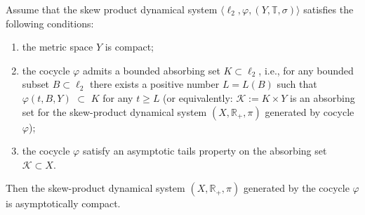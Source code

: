 \documentclass[10pt,a4paper]{amsart}
\begin{document}
\begin{lemma}\label{lCD1} Assume that the skew product dynamical
system $\langle \ell_{2},\varphi,(Y,\mathbb T,\sigma)\rangle$
satisfies the following conditions:
\begin{enumerate}
\item the metric space $Y$ is compact; \item the cocycle $\varphi$
admits a bounded absorbing set $K\subset \ell_{2}$, i.e., for any
bounded subset $B\subset \ell_{2}$ there exists a positive number
$L=L(B)$ such that $\varphi(t,B,Y)$ $\subset $ $K$ for any $t\ge
L$ (or equivalently: $\mathcal K:=K\times Y$ is an absorbing set
for the skew-product dynamical system $(X,\mathbb R_{+},\pi)$
generated by cocycle $\varphi$); \item the cocycle $\varphi$
satisfy an asymptotic tails property on the absorbing set
$\mathcal K \subset X$.
\end{enumerate}

Then the skew-product dynamical system $(X,\mathbb R_{+},\pi)$
generated by the cocycle $\varphi$ is asymptotically compact.
\end{lemma}
\end{document}
